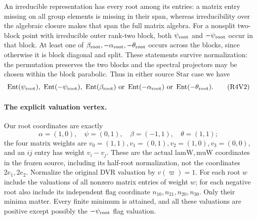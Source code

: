 An irreducible representation has every root among its entries:
a matrix entry missing on all group elements is missing in
their span, whereas irreducibility over the algebraic closure
makes that span the full matrix algebra.
For a nonsplit two-block point with irreducible outer rank-two
block, both \(\psi_{\rm root}\) and \(-\psi_{\rm root}\)
occur in that block. At least one of
\(\beta_{\rm root},-\alpha_{\rm root},-\theta_{\rm root}\)
occurs across the blocks, since otherwise it is block diagonal
and split. These statements survive normalization:
the permutation preserves the two blocks and the spectral
projectors may be chosen within the block parabolic.
Thus in either source \(\mathrm{Star}\) case we have
\[
 \operatorname{Ent}(\psi_{\rm root}),\
 \operatorname{Ent}(-\psi_{\rm root}),\
 \operatorname{Ent}(\beta_{\rm root})\ \text{or}\
 \operatorname{Ent}(-\alpha_{\rm root})\ \text{or}\
 \operatorname{Ent}(-\theta_{\rm root}).                   \tag{R4V2}
\]

\paragraph{The explicit valuation vertex.}
Our root coordinates are exactly
\[
 \alpha=(1,0),\quad\psi=(0,1),\quad
 \beta=(-1,1),\quad\theta=(1,1);
\]
the four matrix weights are
\(v_0=(1,1),v_1=(0,1),v_2=(1,0),v_3=(0,0)\),
and an \(ij\) entry has weight \(v_i-v_j\).
These are the actual \(\mathrm{lamW},\mathrm{muW}\)
coordinates in the frozen source, including its half-root
normalization, not the coordinates \(2e_1,2e_2\).
Normalize the original DVR valuation by \(v(\varpi)=1\).
For each root \(w\) include the valuations of all nonzero
matrix entries of weight \(w\); for each negative root also
include its independent flag coordinate
\(n_{10},n_{21},n_{20},n_{30}\).
Only their minima matter. Every finite minimum is attained,
and all these valuations are positive except possibly
the \(-\psi_{\rm root}\) flag valuation.

